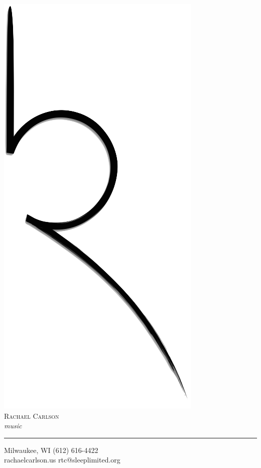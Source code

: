 \includegraphics[scale=0.025]{logo}\\
\textsc{\huge{Rachael Carlson}}\\
\emph{\tiny{music}}
\vspace*{5mm}
\hrule
\vfill
\tiny{Milwaukee, WI \hfill (612) 616-4422} \\ 
\tiny{rachaelcarlson.us} \hfill \tiny{rtc@sleeplimited.org} %
